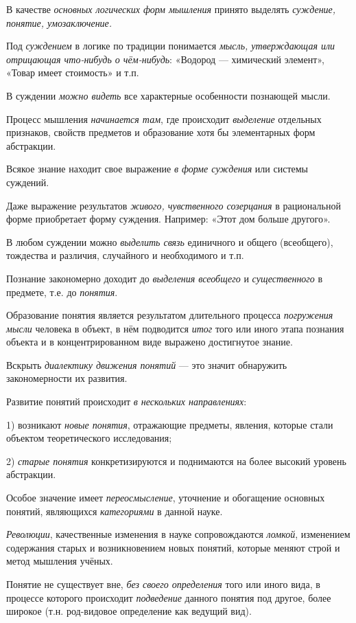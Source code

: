 \documentclass[a4paper,14pt,russian]{extreport}
\begin{document}
В качестве \emph{основных логических форм мышления} принято выделять \emph{суждение, понятие, умозаключение.}

Под \emph{суждением} в логике по традиции понимается \emph{мысль, утверждающая или отрицающая что-нибудь о чём-нибудь}: «Водород --- химический элемент», «Товар имеет стоимость» и т.п.

В суждении \emph{можно видеть} все характерные особенности познающей мысли.

Процесс мышления \emph{начинается там}, где происходит \emph{выделение} отдельных признаков, свойств предметов и образование хотя бы элементарных форм абстракции.

Всякое знание находит свое выражение \emph{в форме суждения} или системы суждений.

Даже выражение результатов \emph{живого, чувственного созерцания} в рациональной форме приобретает форму суждения. Например: «Этот дом больше другого».

В любом суждении можно \emph{выделить связь} единичного и общего (всеобщего), тождества и различия, случайного и необходимого и т.п.

Познание закономерно доходит до \emph{выделения всеобщего} и \emph{существенного} в предмете, т.е. до \emph{понятия}.

Образование понятия является результатом длительного процесса \emph{погружения мысли} человека в объект, в нём подводится \emph{итог} того или иного этапа познания объекта и в концентрированном виде выражено достигнутое знание.

Вскрыть \emph{диалектику движения понятий} --- это значит обнаружить закономерности их развития.

Развитие понятий происходит \emph{в нескольких направлениях}:

1) возникают \emph{новые понятия}, отражающие предметы, явления, которые стали объектом теоретического исследования;

2) \emph{старые понятия} конкретизируются и поднимаются на более высокий уровень абстракции.

Особое значение имеет \emph{переосмысление}, уточнение и обогащение основных понятий, являющихся \emph{категориями} в данной науке.

\emph{Революции}, качественные изменения в науке сопровождаются \emph{ломкой}, изменением содержания старых и возникновением новых понятий, которые меняют строй и метод мышления учёных.

Понятие не существует вне, \emph{без своего определения} того или иного вида, в процессе которого происходит \emph{подведение} данного понятия под другое, более широкое (т.н. род-видовое определение как ведущий вид).
\end{document}
